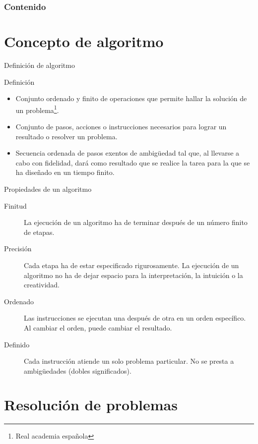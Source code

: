 \begin{frame}
    \frametitle{Contenido}
    \tableofcontents
\end{frame}

\section{Concepto de algoritmo}

\begin{frame}[c]{Definición de algoritmo}
  \begin{block}{Definición}
    \begin{itemize}
      \item Conjunto ordenado y finito de operaciones que permite hallar
            la solución de un problema\footnote{Real academia española}.
      \item Conjunto de pasos, acciones o instrucciones necesarios para
            lograr un resultado o resolver un problema.
      \item Secuencia ordenada de pasos exentos de ambigüedad tal que, al
            llevarse a cabo con fidelidad, dará como resultado que se realice
            la tarea para la que se ha diseñado en un tiempo finito.
    \end{itemize}
  \end{block}
\end{frame}

\begin{frame}[c]{Propiedades de un algoritmo}
  \begin{description}
    \item[Finitud] La ejecución de un algoritmo ha de terminar después de un
      número finito de etapas.
    \item[Precisión] Cada etapa ha de estar especificado rigurosamente. La
      ejecución de un algoritmo no ha de dejar espacio para la interpretación,
      la intuición o la creatividad.
    \item[Ordenado] Las instrucciones se ejecutan una después de otra en un
      orden específico. Al cambiar el orden, puede cambiar el resultado.
    \item[Definido] Cada instrucción atiende un solo problema particular.
      No se presta a ambigüedades (dobles significados).
  \end{description}
\end{frame}

\section{Resolución de problemas}

